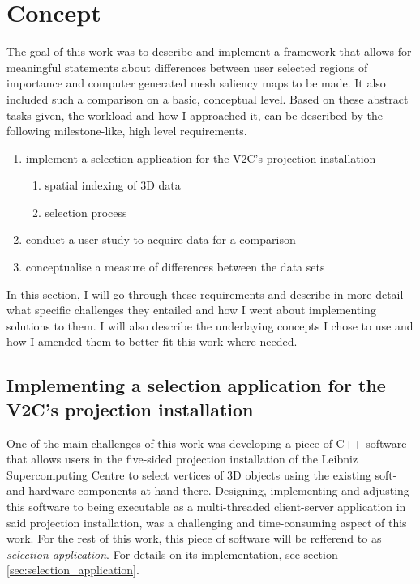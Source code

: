 \chapter{Concept}
\label{sec:concept}


The goal of this work was to describe and implement a framework that allows for meaningful statements about differences between user selected regions of importance and computer generated mesh saliency maps to be made. It also included such a comparison on a basic, conceptual level. Based on these abstract tasks given, the workload and how I approached it, can be described by the following milestone-like, high level requirements.

\begin{enumerate}
	\item implement a selection application for the V2C's projection installation
	\begin{enumerate}
		\item spatial indexing of 3D data
		\item selection process
	\end{enumerate}
	\item conduct a user study to acquire data for a comparison
	\item conceptualise a measure of differences between the data sets
\end{enumerate}

In this section, I will go through these requirements and describe in more detail what specific challenges they entailed and how I went about implementing solutions to them. I will also describe the underlaying concepts I chose to use and how I amended them to better fit this work where needed.

	\section {Implementing a selection application for the V2C's projection installation}
	\label{sec:implementing_selection_application_v2c}
One of the main challenges of this work was developing a piece of C++ software that allows users in the five-sided projection installation of the Leibniz Supercomputing Centre to select vertices of 3D objects using the existing soft- and hardware components at hand there. Designing, implementing and adjusting this software to being executable as a multi-threaded client-server application in said projection installation, was a challenging and time-consuming aspect of this work. For the rest of this work, this piece of software will be refferend to as \textit{selection application}. For details on its implementation, see section \ref{sec:selection_application}.

